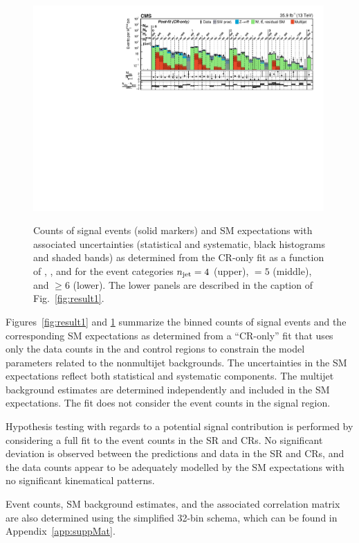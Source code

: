 \begin{figure}[!p]
  \includegraphics[width=0.99\textwidth]{CMS-SUS-16-038_Figure_002-c.pdf}\\
  \caption{Counts of signal events (solid markers) and SM expectations
    with associated uncertainties (statistical and systematic, black
    histograms and shaded bands) as determined from the CR-only fit as
    a function of \nb, \scalht, and \mht for the event categories
    $n_{\text{jet}} = 4$ (upper), $=5$ (middle), and ${\geq}6$ (lower). The
    lower panels are described in the caption of
    Fig.~\ref{fig:result1}.  }
  \label{fig:result2}
\end{figure}

Figures~\ref{fig:result1} and \ref{fig:result2} summarize the binned
counts of signal events and the corresponding SM expectations as
determined from a ``CR-only'' fit that uses only the data counts in
the \mj and \mmj control regions to constrain the model parameters
related to the nonmultijet backgrounds. The uncertainties in the SM
expectations reflect both statistical and systematic components. The
multijet background estimates are determined independently and
included in the SM expectations. The fit does not consider the event
counts in the signal region.

Hypothesis testing with regards to a potential signal contribution is
performed by considering a full fit to the event counts in the SR and
CRs. No significant deviation is observed between the predictions and
data in the SR and CRs, and the data counts appear to be adequately
modelled by the SM expectations with no significant kinematical
patterns.

Event counts, SM background estimates, and the associated correlation
matrix are also determined using the simplified 32-bin schema, which
can be found in Appendix~\ref{app:suppMat}.

